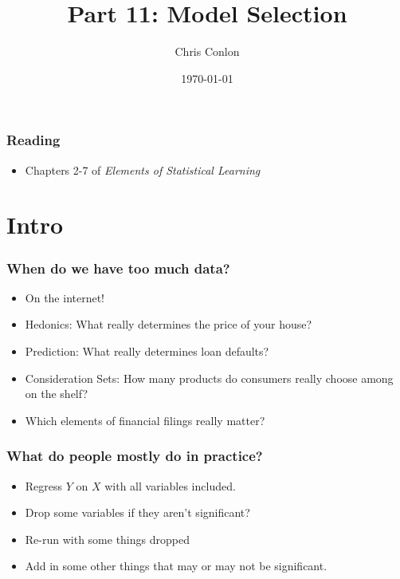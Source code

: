 \documentclass[xcolor=pdftex,dvipsnames,table,mathserif,aspectratio=169]{beamer}
\begin{document}
\title{Part 11: Model Selection}
\author{Chris Conlon}
\date{\today}

\frame{\titlepage}


\begin{frame}
\frametitle{Reading}
\begin{itemize}
\item Chapters 2-7 of \textit{Elements of Statistical Learning}
\end{itemize}

\end{frame}



\section{Intro}


\begin{frame}
\frametitle{When do we have too much data?}
\begin{itemize}
\item On the internet!
\item Hedonics: What really determines the price of your house?
\item Prediction: What really determines loan defaults?
\item Consideration Sets: How many products do consumers really choose among on the shelf?
\item Which elements of financial filings really matter?
\end{itemize}
\end{frame}


\begin{frame}
\frametitle{What do people mostly do in practice?}
\begin{itemize}
\item Regress $Y$ on $X$ with all variables included.
\item Drop some variables if they aren't significant?
\item Re-run with some things dropped
\item Add in some other things that may or may not be significant.
\end{itemize}
\end{frame}
\end{document}
